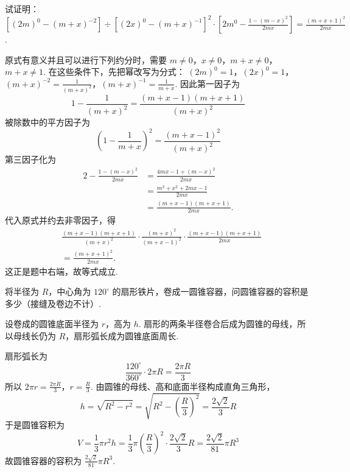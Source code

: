 \begin{problem}
试证明：\(\left[\left(2m\right)^0-\left(m+x\right)^{-2}\right]\div\left[\left(2x\right)^0-\left(m+x\right)^{-1}\right]^2\cdot\left[2m^0-\frac{1-\left(m-x\right)^2}{2mx}\right]=\frac{\left(m+x+1\right)^2}{2mx}\).
\end{problem}

\begin{solution}
原式有意义并且可以进行下列约分时，需要
\(m\ne0\)，\(x\ne0\)，\(m+x\ne0\)，\(m+x\ne1\). 在这些条件下，先把幂改写为分式：
\(\left(2m\right)^0=1\)，\(\left(2x\right)^0=1\)，\(\left(m+x\right)^{-2}=\frac{1}{\left(m+x\right)^2}\)，\(\left(m+x\right)^{-1}=\frac{1}{m+x}\).
因此第一因子为
\[
1-\frac{1}{\left(m+x\right)^2}
=\frac{\left(m+x-1\right)\left(m+x+1\right)}{\left(m+x\right)^2}
\]
被除数中的平方因子为
\[
\left(1-\frac{1}{m+x}\right)^2
=\frac{\left(m+x-1\right)^2}{\left(m+x\right)^2}
\]
第三因子化为
\[
\begin{aligned}
2-\frac{1-\left(m-x\right)^2}{2mx}
&=\frac{4mx-1+\left(m-x\right)^2}{2mx}\\
&=\frac{m^2+x^2+2mx-1}{2mx}\\
&=\frac{\left(m+x-1\right)\left(m+x+1\right)}{2mx}.
\end{aligned}
\]
代入原式并约去非零因子，得
\[
\begin{aligned}
&\frac{\left(m+x-1\right)\left(m+x+1\right)}{\left(m+x\right)^2}
\cdot\frac{\left(m+x\right)^2}{\left(m+x-1\right)^2}
\cdot\frac{\left(m+x-1\right)\left(m+x+1\right)}{2mx}\\
&=\frac{\left(m+x+1\right)^2}{2mx}.
\end{aligned}
\]
这正是题中右端，故等式成立.
\end{solution}

\begin{problem}
将半径为 \(R\)，中心角为 \(120^\circ\) 的扇形铁片，卷成一圆锥容器，问圆锥容器的容积是多少（接缝及卷边不计）.
\end{problem}

\begin{solution}
设卷成的圆锥底面半径为 \(r\)，高为 \(h\). 扇形的两条半径卷合后成为圆锥的母线，所以母线长仍为 \(R\)，扇形弧长成为圆锥底面周长.

扇形弧长为
\[
\frac{120^\circ}{360^\circ}\cdot2\pi R=\frac{2\pi R}{3}
\]
所以
\(2\pi r=\frac{2\pi R}{3}\)，\(r=\frac{R}{3}\).
由圆锥的母线、高和底面半径构成直角三角形，
\[
h=\sqrt{R^2-r^2}
=\sqrt{R^2-\left(\frac{R}{3}\right)^2}
=\frac{2\sqrt2}{3}R
\]
于是圆锥容积为
\[
V=\frac13\pi r^2h
=\frac13\pi\left(\frac{R}{3}\right)^2\cdot\frac{2\sqrt2}{3}R
=\frac{2\sqrt2}{81}\pi R^3
\]
故圆锥容器的容积为 \(\frac{2\sqrt2}{81}\pi R^3\).

\end{solution}

